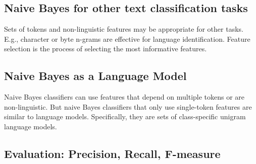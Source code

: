\subsection{Naive Bayes for other text classification tasks}

Sets of tokens and non-linguistic features may be appropriate for other tasks.
E.g., character or byte n-grams are effective for language identification.
Feature selection is the process of selecting the most informative features.

\subsection{Naive Bayes as a Language Model}

Naive Bayes classifiers can use features that depend on multiple tokens or are non-linguistic.
But naive Bayes classifiers that only use single-token features are similar to language models.
Specifically, they are sets of class-specific unigram language models.

\subsection{Evaluation: Precision, Recall, F-measure}

